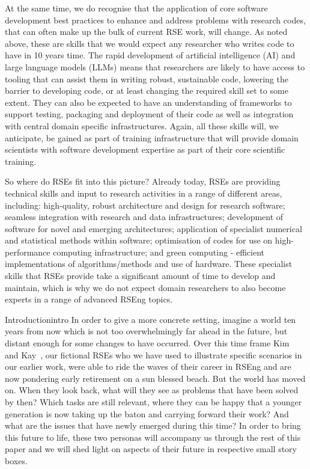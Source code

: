 \documentclass{eceasst}
\begin{document}
At the same time, we do recognise that the application of core software development best practices
to enhance and address problems with research codes, that can often make up the bulk of current RSE work, will change.
As noted above, these are skills that we would expect any researcher who writes code to have in 10 years time.
The rapid development of artificial intelligence (AI) and large language models
(LLMs) means that researchers are likely to have access to tooling that can assist
them in writing robust, sustainable code, lowering the barrier to developing code,
or at least changing the required skill set to some extent.
They can also be expected to have an understanding of frameworks to support testing, packaging and
deployment of their code as well as integration with central domain specific infrastructures.
Again, all these skills will, we anticipate, be gained as part of training infrastructure that will
provide domain scientists with software development expertise as part of their core scientific training.

So where do RSEs fit into this picture?
Already today, RSEs are providing technical skills and input to research activities in a range of different areas, including:
high-quality, robust architecture and design for research software;
seamless integration with research and data infrastructures;
development of software for novel and emerging architectures;
application of specialist numerical and statistical methods within software;
optimisation of codes for use on high-performance computing infrastructure;
and green computing - efficient implementations of algorithms/methods and use of hardware.
These specialist skills that RSEs provide take a significant amount of time to develop and maintain,
which is why we do not expect domain researchers to also become experts in a range of advanced RSEng topics.


\begin{story}{Introduction}{intro}
In order to give a more concrete setting, imagine a world ten years from now 
which is not too overwhelmingly far ahead in the future, but distant enough for some changes to have occurred.
Over this time frame Kim~\cite{Anzt2021} and Kay~\cite{Goth2024},
our fictional RSEs who we have used to illustrate specific scenarios in our earlier work,
were able to ride the waves of their career in RSEng and are now pondering early retirement on a sun blessed beach.
But the world has moved on.
When they look back, what will they see as problems that have been solved by then?
Which tasks are still relevant, where they can be happy that a younger generation is now taking up the baton and carrying forward their work?
And what are the issues that have newly emerged during this time?
In order to bring this future to life, these two personas will accompany us through the rest of this paper and we will shed light on aspects
of their future in respective small story boxes.
\end{story}
\end{document}
